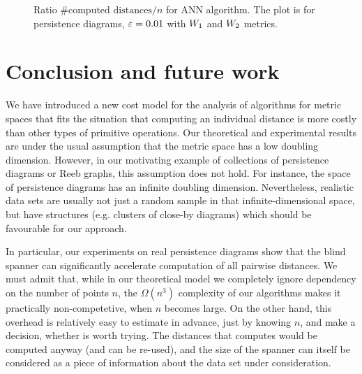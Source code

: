 \begin{figure}[!htbp]
    \begin{centering}
\end{centering}
    \caption{ Ratio $\mbox{\# computed distances} / n$ for ANN algorithm. The plot is for  persistence diagrams,
    $\varepsilon = 0.01$ with ${W_{1}}$ and ${W_{2}}$ metrics.}
    \label{fig:ann_const_ratio_mcgill}
\end{figure}


\section{Conclusion and future work}
\label{sec:conclusion}
%
We have introduced a new cost model for the analysis of algorithms
for metric spaces that fits the situation that computing an individual distance
is more costly than other types of primitive operations.
Our theoretical and experimental results are under the usual assumption
that the metric space has a low doubling dimension.
However, in our motivating example of collections of persistence diagrams
or Reeb graphs, this assumption does not hold. For instance,
the space of persistence diagrams has an infinite doubling dimension.
Nevertheless, realistic data sets are usually not just a random sample
in that infinite-dimensional space, but have structures
(e.g. clusters of close-by diagrams) which should be favourable for our approach.


In particular, our experiments on real persistence diagrams
show that the blind spanner can significantly accelerate
computation of all pairwise distances. We must admit that,
while in our theoretical model we completely ignore dependency on the number of points $n$,
the $\Omega(n^3)$ complexity of our algorithms makes it practically
non-competetive, when $n$ becomes large.
On the other hand, this overhead is relatively easy to estimate
in advance, just by knowing $n$, and make a decision,
whether \bgrdy is worth trying. 
The distances that \bgrdy computes would be computed anyway (and can be re-used),
and the size of the \bgrdy spanner can itself be considered as a piece
of information about the data set under consideration.


